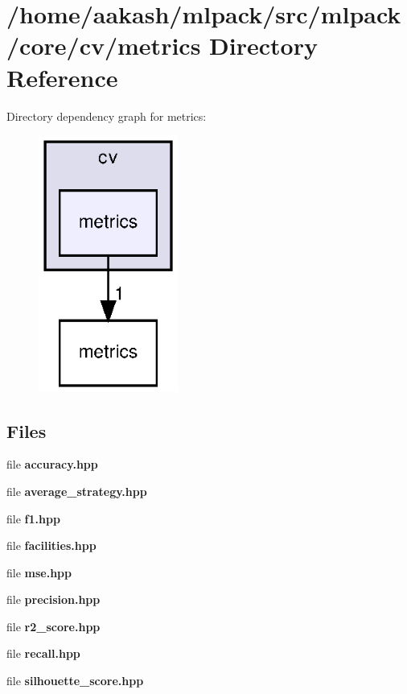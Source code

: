 \section{/home/aakash/mlpack/src/mlpack/core/cv/metrics Directory Reference}
\label{dir_eecf06612edb6375565d9346b54b75c8}
Directory dependency graph for metrics\+:
\nopagebreak
\begin{figure}[H]
\begin{center}
\leavevmode
\includegraphics[width=130pt]{dir_eecf06612edb6375565d9346b54b75c8_dep}
\end{center}
\end{figure}
\subsection*{Files}
\begin{DoxyCompactItemize}
\item 
file \textbf{ accuracy.\+hpp}
\item 
file \textbf{ average\+\_\+strategy.\+hpp}
\item 
file \textbf{ f1.\+hpp}
\item 
file \textbf{ facilities.\+hpp}
\item 
file \textbf{ mse.\+hpp}
\item 
file \textbf{ precision.\+hpp}
\item 
file \textbf{ r2\+\_\+score.\+hpp}
\item 
file \textbf{ recall.\+hpp}
\item 
file \textbf{ silhouette\+\_\+score.\+hpp}
\end{DoxyCompactItemize}
